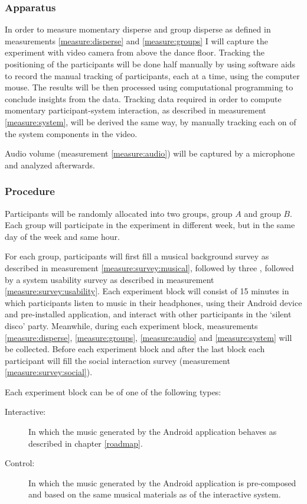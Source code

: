 \subsubsection{Apparatus}

In order to measure momentary disperse and group disperse as defined in measurements \ref{measure:disperse} and \ref{measure:groups} I will capture the experiment with video camera from above the dance floor.
Tracking the positioning of the participants will be done half manually by using software aids to record the manual tracking of participants, each at a time, using the computer mouse.
The results will be then processed using computational programming to conclude insights from the data.
Tracking data required in order to compute momentary participant-system interaction, as described in measurement \ref{measure:system}, will be derived the same way, by manually tracking each on of the system components in the video.

Audio volume (measurement \ref{measure:audio}) will be captured by a microphone and analyzed afterwards.

\subsubsection{Procedure}

Participants will be randomly allocated into two groups, group $A$ and group $B$\@.
Each group will participate in the experiment in different week, but in the same day of the week and same hour.

For each group, participants will first fill a musical background survey as described in measurement \ref{measure:survey:musical}, followed by three , followed by a system usability survey as described in measurement \ref{measure:survey:usability}.
Each experiment block will consist of 15 minutes in which participants listen to music in their headphones, using their Android device and pre-installed application, and interact with other participants in the `silent disco' party.
Meanwhile, during each experiment block, measurements \ref{measure:disperse}, \ref{measure:groups}, \ref{measure:audio} and \ref{measure:system} will be collected.
Before each experiment block and after the last block each participant will fill the social interaction survey (measurement \ref{measure:survey:social}).

Each experiment block can be of one of the following types:
\begin{description}
	\item[Interactive:] In which the music generated by the Android application behaves as described in chapter \ref{roadmap}.
	\item[Control:] In which the music generated by the Android application is pre-composed and based on the same musical materials as of the interactive system.
\end{description}

